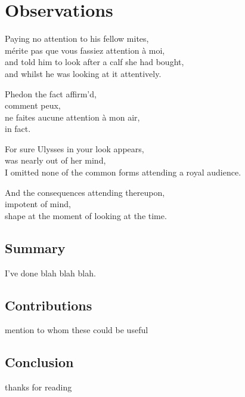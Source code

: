 
\chapter{Observations}
\label{ch:observations}

\startcontents[chapters]

\vfill

Paying no attention to his fellow mites, \\
mérite pas que vous fassiez attention à moi, \\
and told him to look after a calf she had bought, \\
and whilst he was looking at it attentively.

Phedon the fact affirm'd, \\
comment peux, \\
ne faites aucune attention à mon air, \\
in fact.

For sure Ulysses in your look appears, \\
was nearly out of her mind, \\
I omitted none of the common forms attending a royal audience.

And the consequences attending thereupon, \\
impotent of mind, \\
shape at the moment of looking at the time.

\newpage
\minicontents
\spirals



\section{Summary}

I've done blah blah blah.


\section{Contributions}

mention to whom these could be useful


\section{Conclusion}

thanks for reading


\stopcontents[chapters]

